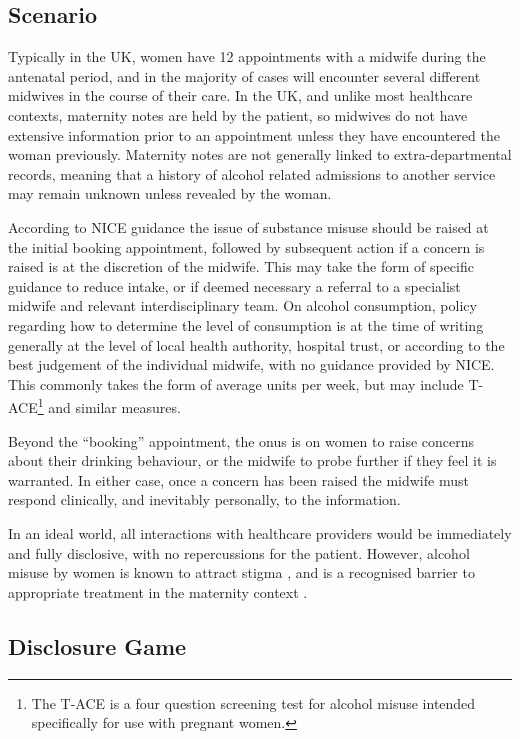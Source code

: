 \subsection{Scenario}
\label{sec:scenario}

Typically in the UK, women have 12 appointments with a midwife during the antenatal period, and in the majority of cases will encounter several different midwives \citep{Redshaw2014} in the course of their care. In the UK, and unlike most healthcare contexts, maternity notes are held by the patient, so midwives do not have extensive information prior to an appointment unless they have encountered the woman previously. Maternity notes are not generally linked to extra-departmental records, meaning that a history of alcohol related admissions to another service may remain unknown unless revealed by the woman.

According to NICE guidance \citep{NICE2010a,NICE2010} the issue of substance misuse should be raised at the initial booking appointment, followed by subsequent action if a concern is raised is at the discretion of the midwife. This may take the form of specific guidance to reduce intake, or if deemed necessary a referral to a specialist midwife and relevant interdisciplinary team. On alcohol consumption, policy regarding how to determine the level of consumption is at the time of writing generally at the level of local health authority, hospital trust, or according to the best judgement of the individual midwife, with no guidance provided by NICE. This commonly takes the form of average units per week, but may include \ac{T-ACE}\footnote{The \ac{T-ACE} is a four question screening test for alcohol misuse intended specifically for use with pregnant women.} \citep{Sokol1989863} and similar measures. 

Beyond the \enquote{booking} appointment, the onus is on women to raise concerns about their drinking behaviour, or the midwife to probe further if they feel it is warranted. In either case, once a concern has been raised the midwife must respond clinically, and inevitably personally, to the information.

In an ideal world, all interactions with healthcare providers would be immediately and fully disclosive, with no repercussions for the patient. However, alcohol misuse by women is known to attract stigma \citep{Gomberg1988}, and is a recognised barrier to appropriate treatment in the maternity context \citep{NICE2010,Radcliffe2011}.


\subsection{Disclosure Game}
\label{sub:the_game}

